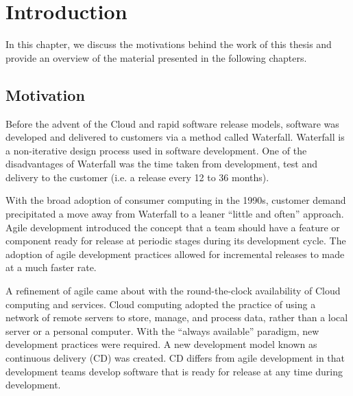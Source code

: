 

\chapter{Introduction}\label{ch:intro}

\begin{textsl}
{\small In this chapter, we discuss the motivations behind the work of this thesis and provide an overview of the material presented in the following chapters.}
\end{textsl}

\vspace*{1cm}

\section{Motivation}
Before the advent of the Cloud and rapid software release models, software was developed and delivered to customers via a method called Waterfall. Waterfall is a non-iterative design process used in software development. One of the disadvantages of Waterfall was the time taken from development, test and delivery to the customer (i.e. a release every 12 to 36 months).

With the broad adoption of consumer computing in the 1990s, customer demand precipitated a move away from Waterfall to a leaner ``little and often'' approach. Agile development introduced the concept that a team should have a feature or component ready for release at periodic stages during its development cycle. The adoption of agile development practices allowed for incremental releases to made at a much faster rate.

A refinement of agile came about with the round-the-clock availability of Cloud computing and services. Cloud computing adopted the practice of using a network of remote servers to store, manage, and process data, rather than a local server or a personal computer. With the ``always available'' paradigm, new development practices were required. A new development model known as continuous delivery (CD) was created. CD differs from agile development in that development teams develop software that is ready for release at any time during development.

